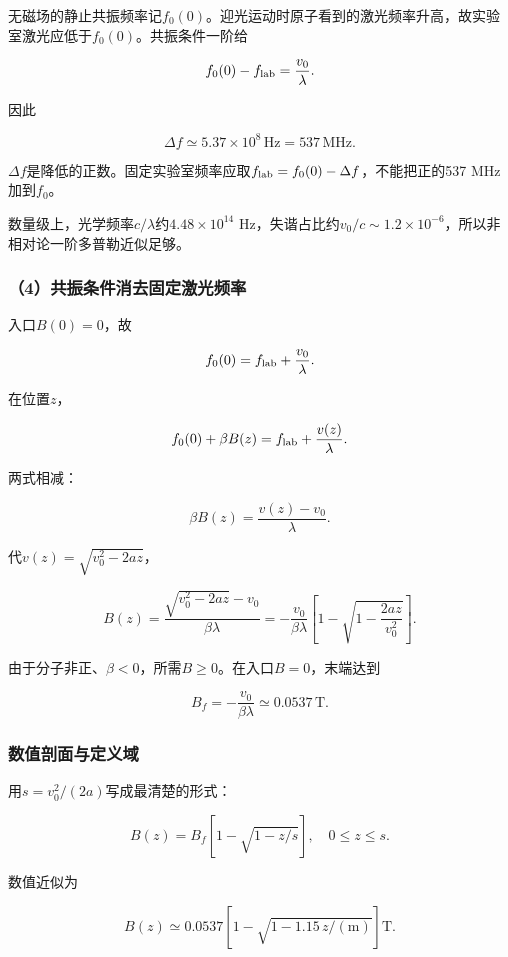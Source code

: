 \documentclass[12pt,a4paper,fontset=fandol]{ctexart}
\begin{document}
无磁场的静止共振频率记\(f_0(0)\)。迎光运动时原子看到的激光频率升高，故实验室激光应低于\(f_0(0)\)。共振条件一阶给

\[
f_0(0)-f_{\rm lab}=\frac{v_0}{\lambda}.
\]

因此

\[
\boxed{\Delta f\simeq5.37\times10^8\,\mathrm{Hz}
=537\,\mathrm{MHz}}.
\]

\(\Delta f\)是降低的正数。固定实验室频率应取\(f_{\rm lab}=f_0(0)-\Delta f\)，不能把正的537
MHz加到\(f_0\)。

数量级上，光学频率\(c/\lambda\)约\(4.48\times10^{14}\)
Hz，失谐占比约\(v_0/c\sim1.2\times10^{-6}\)，所以非相对论一阶多普勒近似足够。

\subsubsection{（4）共振条件消去固定激光频率}\label{ux5171ux632fux6761ux4ef6ux6d88ux53bbux56faux5b9aux6fc0ux5149ux9891ux7387}

入口\(B(0)=0\)，故

\[
f_0(0)=f_{\rm lab}+\frac{v_0}{\lambda}.
\]

在位置\(z\)，

\[
f_0(0)+\beta B(z)
=f_{\rm lab}+\frac{v(z)}{\lambda}.
\]

两式相减：

\[
\beta B(z)=\frac{v(z)-v_0}{\lambda}.
\]

代\(v(z)=\sqrt{v_0^2-2az}\)，

\[
\boxed{
B(z)=\frac{\sqrt{v_0^2-2az}-v_0}{\beta\lambda}
=-\frac{v_0}{\beta\lambda}
\left[1-\sqrt{1-\frac{2az}{v_0^2}}\right]}.
\]

由于分子非正、\(\beta<0\)，所需\(B\geq0\)。在入口\(B=0\)，末端达到

\[
\boxed{B_f=-\frac{v_0}{\beta\lambda}
\simeq0.0537\,\mathrm T}.
\]

\subsubsection{数值剖面与定义域}\label{ux6570ux503cux5256ux9762ux4e0eux5b9aux4e49ux57df}

用\(s=v_0^2/(2a)\)写成最清楚的形式：

\[
\boxed{
B(z)=B_f\left[1-\sqrt{1-z/s}\right],
\quad0\leq z\leq s}.
\]

数值近似为

\[
B(z)\simeq0.0537
\left[1-\sqrt{1-1.15\,z/(\mathrm m)}\right]\mathrm T.
\]
\end{document}
